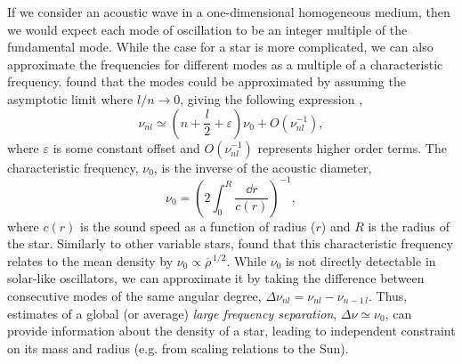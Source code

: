 If we consider an acoustic wave in a one-dimensional homogeneous medium, then we would expect each mode of oscillation to be an integer multiple of the fundamental mode. While the case for a star is more complicated, we can also approximate the frequencies for different modes as a multiple of a characteristic frequency. \citet{Tassoul1980} found that the modes could be approximated by assuming the asymptotic limit where \(l/n \rightarrow 0\), giving the following expression \citep[cf.][]{Gough1986},
%
\begin{equation}
    \nu_{nl} \simeq \left(n + \frac{l}{2} + \varepsilon\right) \nu_0 + O(\nu_{nl}^{-1}), \label{eq:asy}
\end{equation}
%
where \(\varepsilon\) is some constant offset and \(O(\nu_{nl}^{-1})\) represents higher order terms. The characteristic frequency, \(\nu_0\), is the inverse of the acoustic diameter,
%
\begin{equation}
    \nu_0 = \left(2 \int_{0}^{R} \frac{\dd r}{c(r)}\right)^{-1},
\end{equation}
%
where \(c(r)\) is the sound speed as a function of radius (\(r\)) and \(R\) is the radius of the star. Similarly to other variable stars, \citet{Ulrich1986} found that this characteristic frequency relates to the mean density by \(\nu_0 \propto \overline{\rho}^{\,1/2}\). While \(\nu_0\) is not directly detectable in solar-like oscillators, we can approximate it by taking the difference between consecutive modes of the same angular degree, \(\Delta\nu_{nl} = \nu_{nl} - \nu_{n-1\,l}\). Thus, estimates of a global (or average) \emph{large frequency separation}, \(\Delta\nu \simeq \nu_0\), can provide information about the density of a star, leading to independent constraint on its mass and radius (e.g. from scaling relations to the Sun).

